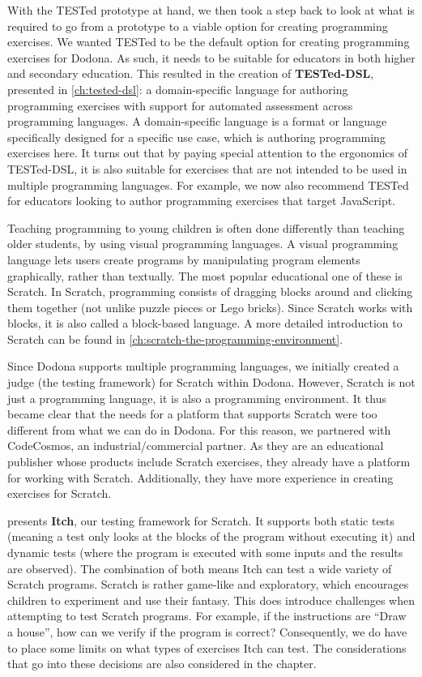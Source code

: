 \documentclass[main]{subfiles}
\begin{document}
With the TESTed prototype at hand, we then took a step back to look at what is required to go from a prototype to a viable option for creating programming exercises.
We wanted TESTed to be the default option for creating programming exercises for Dodona.
As such, it needs to be suitable for educators in both higher and secondary education.
This resulted in the creation of \textbf{TESTed-DSL}, presented in \cref{ch:tested-dsl}: a domain-specific language for authoring programming exercises with support for automated assessment across programming languages.
A domain-specific language is a format or language specifically designed for a specific use case, which is authoring programming exercises here.
It turns out that by paying special attention to the ergonomics of TESTed-DSL, it is also suitable for exercises that are not intended to be used in multiple programming languages.
For example, we now also recommend TESTed for educators looking to author programming exercises that target JavaScript.

Teaching programming to young children is often done differently than teaching older students, by using visual programming languages.
A visual programming language lets users create programs by manipulating program elements graphically, rather than textually.
The most popular educational one of these is Scratch.
In Scratch, programming consists of dragging blocks around and clicking them together (not unlike puzzle pieces or Lego bricks).
Since Scratch works with blocks, it is also called a block-based language.
A more detailed introduction to Scratch can be found in \cref{ch:scratch-the-programming-environment}.

Since Dodona supports multiple programming languages, we initially created a judge (the testing framework) for Scratch within Dodona.
However, Scratch is not just a programming language, it is also a programming environment.
It thus became clear that the needs for a platform that supports Scratch were too different from what we can do in Dodona.
For this reason, we partnered with CodeCosmos, an industrial/commercial partner.
As they are an educational publisher whose products include Scratch exercises, they already have a platform for working with Scratch.
Additionally, they have more experience in creating exercises for Scratch.

 presents \textbf{Itch}, our testing framework for Scratch.
It supports both static tests (meaning a test only looks at the blocks of the program without executing it) and dynamic tests (where the program is executed with some inputs and the results are observed).
The combination of both means Itch can test a wide variety of Scratch programs.
Scratch is rather game-like and exploratory, which encourages children to experiment and use their fantasy.
This does introduce challenges when attempting to test Scratch programs.
For example, if the instructions are ``Draw a house'', how can we verify if the program is correct?
Consequently, we do have to place some limits on what types of exercises Itch can test.
The considerations that go into these decisions are also considered in the chapter.
\end{document}

